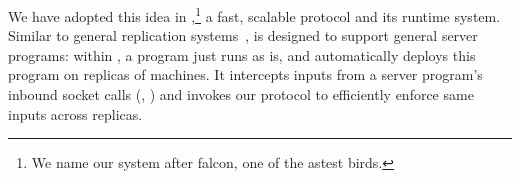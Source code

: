 % 
% 
% 

We have adopted this idea in \xxx,\footnote{We name our system after 
falcon, one of the astest birds.} a fast, scalable \paxos protocol and its 
runtime system. Similar to general replication
systems~\cite{eve:osdi12,rex:eurosys14,crane:sosp15}, \xxx is designed to 
support general server programs: within \xxx, a program just runs 
as is, and \xxx automatically deploys this program on replicas of machines. It 
intercepts inputs from a server program's inbound socket calls (\eg, \recv) and 
invokes our \paxos protocol to efficiently enforce same inputs across 
replicas.

